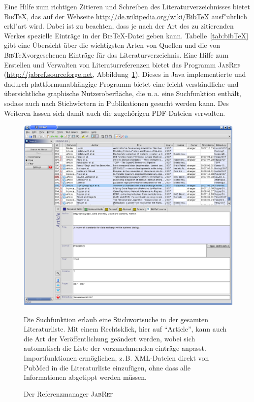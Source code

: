 Eine Hilfe zum richtigen Zitieren und Schreiben des Literaturverzeichnisses
bietet \textsc{Bib}\-\TeX, das auf der Webseite
\url{http://de.wikipedia.org/wiki/BibTeX} ausf"uhrlich erkl"art wird.
Dabei ist zu beachten, dass je nach der Art des zu zitierenden Werkes spezielle
Einträge in der \textsc{Bib}\TeX-Datei geben kann. Tabelle~\ref{tab:bibTeX} gibt
eine Übersicht über die wichtigsten Arten von Quellen und die von
\textsc{Bib}\TeX vorgesehenen Einträge für das Literaturverzeichnis. Eine Hilfe
zum Erstellen und Verwalten von Literaturreferenzen bietet das Programm
\textsc{JabRef} (\url{http://jabref.sourceforge.net},
Abbildung~\ref{fig:JabRef}). Dieses in Java implementierte und dadurch
plattformunabhängige Programm bietet eine leicht verständliche und
übersichtliche graphische Nutzeroberfläche, die u.\,a. eine Suchfunktion
enthält, sodass auch nach Stichwörtern in Publikationen gesucht werden kann.
Des Weiteren lassen sich damit auch die zugehörigen PDF-Dateien
verwalten.
\begin{figure}[htbp]
 {\centering\includegraphics[width=\textwidth]{img/jabref}
 \caption{Der Referenzmanager \textsc{JabRef}}\label{fig:JabRef}}
 \begin{small}
 Die Suchfunktion erlaub eine Stichwortsuche in der gesamten Literaturliste.
 Mit einem Rechtsklick, hier auf "`Article"', kann auch die Art der
 Veröffentlichung geändert werden, wobei sich automatisch die Liste der
 vorzunehmenden einträge anpasst. Importfunktionen ermöglichen, z.\,B.
 XML-Dateien direkt von PubMed in die Literaturliste einzufügen, ohne dass alle
 Informationen abgetippt werden müssen.
 \end{small}
\end{figure}
